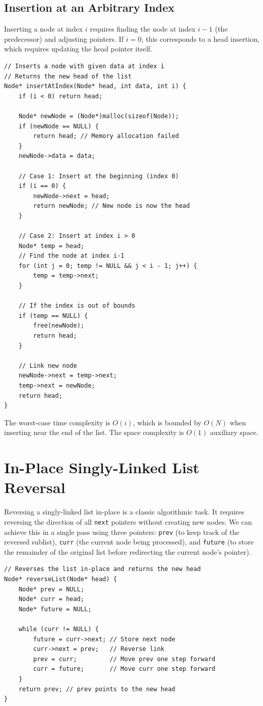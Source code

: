 \documentclass[10pt,journal,compsoc]{IEEEtran}
\begin{document}
\subsection{Insertion at an Arbitrary Index}
Inserting a node at index $i$ requires finding the node at index $i-1$ (the predecessor) and adjusting pointers. If $i = 0$, this corresponds to a head insertion, which requires updating the head pointer itself.

\begin{verbatim}
// Inserts a node with given data at index i
// Returns the new head of the list
Node* insertAtIndex(Node* head, int data, int i) {
    if (i < 0) return head;
    
    Node* newNode = (Node*)malloc(sizeof(Node));
    if (newNode == NULL) {
        return head; // Memory allocation failed
    }
    newNode->data = data;
    
    // Case 1: Insert at the beginning (index 0)
    if (i == 0) {
        newNode->next = head;
        return newNode; // New node is now the head
    }
    
    // Case 2: Insert at index i > 0
    Node* temp = head;
    // Find the node at index i-1
    for (int j = 0; temp != NULL && j < i - 1; j++) {
        temp = temp->next;
    }
    
    // If the index is out of bounds
    if (temp == NULL) {
        free(newNode);
        return head;
    }
    
    // Link new node
    newNode->next = temp->next;
    temp->next = newNode;
    return head;
}
\end{verbatim}

The worst-case time complexity is $O(i)$, which is bounded by $O(N)$ when inserting near the end of the list. The space complexity is $O(1)$ auxiliary space.

\section{In-Place Singly-Linked List Reversal}
Reversing a singly-linked list in-place is a classic algorithmic task. It requires reversing the direction of all \texttt{next} pointers without creating new nodes. We can achieve this in a single pass using three pointers: \texttt{prev} (to keep track of the reversed sublist), \texttt{curr} (the current node being processed), and \texttt{future} (to store the remainder of the original list before redirecting the current node's pointer).

\begin{verbatim}
// Reverses the list in-place and returns the new head
Node* reverseList(Node* head) {
    Node* prev = NULL;
    Node* curr = head;
    Node* future = NULL;
    
    while (curr != NULL) {
        future = curr->next; // Store next node
        curr->next = prev;   // Reverse link
        prev = curr;         // Move prev one step forward
        curr = future;       // Move curr one step forward
    }
    return prev; // prev points to the new head
}
\end{verbatim}
\end{document}
